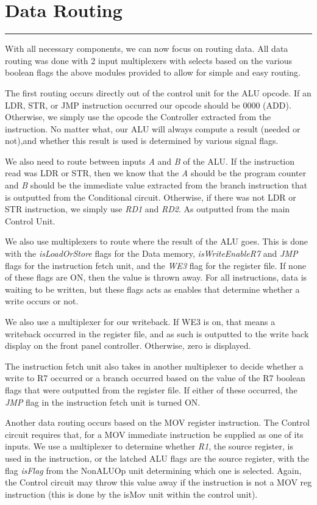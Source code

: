 \documentclass[12pt, letter]{article}
\begin{document}
	\section{Data Routing}
	\hrule
	
	With all necessary components, we can now focus on routing data. All data routing was done with 2 input multiplexers with selects based on the various boolean flags the above modules provided to allow for simple and easy routing. 
	
	The first routing occurs directly out of the control unit for the ALU opcode. If an LDR, STR, or JMP instruction occurred our opcode should be 0000 (ADD). Otherwise, we simply use the opcode the Controller extracted from the instruction. No matter what, our ALU will always compute a result (needed or not),and whether this result is used is determined by various signal flags.
	
	We also need to route between inputs \textit{A} and \textit{B} of the ALU. If the instruction read was LDR or STR, then we know that the \textit{A} should be the program counter and \textit{B} should be the immediate value extracted from the branch instruction that is outputted from the Conditional circuit. Otherwise, if there was not LDR or STR instruction, we simply use \textit{RD1} and \textit{RD2}. As outputted from the main Control Unit. 
	
	We also use multiplexers to route where the result of the ALU goes. This is done with the \textit{isLoadOrStore} flags for the Data memory, \textit{isWriteEnableR7} and \textit{JMP} flags for the instruction fetch unit, and the \textit{WE3} flag for the register file. If none of these flags are ON, then the value is thrown away. For all instructions, data is waiting to be written, but these flags acts as enables that determine whether a write occurs or not. 
	
	We also use a multiplexer for our writeback. If WE3 is on, that means a writeback occurred in the register file, and as such is outputted to the write back display on the front panel controller. Otherwise, zero is displayed. 
	
	The instruction fetch unit also takes in another multiplexer to decide whether a write to R7 occurred or a branch occurred based on the value of the R7 boolean flags that were outputted from the register file. If either of these occurred, the \textit{JMP} flag in the instruction fetch unit is turned ON.
	
	Another data routing occurs based on the MOV register instruction. The Control circuit requires that, for a MOV immediate instruction be supplied as one of its inputs. We use a multiplexer to determine whether \textit{R1}, the source register, is used in the instruction, or the latched ALU flags are the source register, with the flag \textit{isFlag} from the NonALUOp unit determining which one is selected. Again, the Control circuit may throw this value away if the instruction is not a MOV reg instruction (this is done by the isMov unit within the control unit).
	
\end{document}
